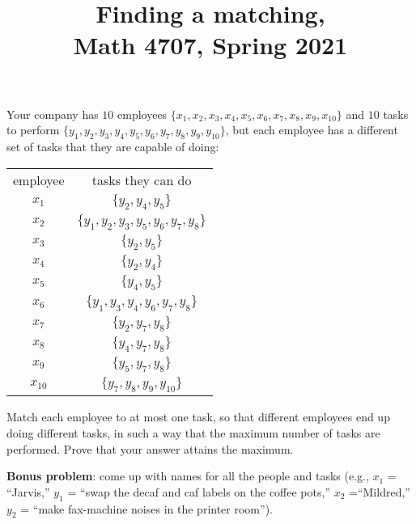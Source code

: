 \documentclass[11pt]{article}
\title{Finding a matching, \\ Math 4707, Spring 2021}
\date{}
\begin{document}
\maketitle

\thispagestyle{empty}

Your company has $10$ employees $\{x_1, x_2, x_3, x_4, x_5, x_6, x_7, x_8,x_9,x_{10}\}$ and $10$ tasks to perform $\{y_1, y_2, y_3, y_4, y_5, y_6, y_7, y_8,y_9,y_{10}\}$, but each employee has a different set of tasks that they are capable of doing: 
\begin{center}
\begin{tabular}{c  c}
employee & tasks they can do \\
$x_1$ & $\{y_2, y_4, y_5\}$ \\
$x_2$ & $\{y_1, y_2, y_3, y_5, y_6, y_7, y_8\}$ \\
$x_3$ & $\{y_2, y_5\}$ \\
$x_4$ & $\{y_2, y_4\}$ \\
$x_5$ & $\{y_4, y_5\}$ \\
$x_6$ & $\{y_1, y_3,  y_4, y_6, y_7, y_8\}$ \\
$x_7$ & $\{y_2,y_7,y_8\}$ \\
$x_8$ & $\{y_4,y_7,y_8\}$ \\
$x_9$ & $\{y_5, y_7, y_8\}$ \\
$x_{10}$ & $\{y_7, y_8, y_9,y_{10}\}$
\end{tabular}
\end{center}
Match each employee to at most one task, so that different employees end up doing different tasks, in such a way that the maximum number of tasks are performed. Prove that your answer attains the maximum.

\medskip

{\bf Bonus problem}: come up with names for all the people and tasks (e.g., $x_1$ = ``Jarvis,'' $y_1$ = ``swap the decaf and caf labels on the coffee pots,'' $x_2$ =``Mildred,'' $y_2$ = ``make fax-machine noises in the printer room'').
\end{document}
